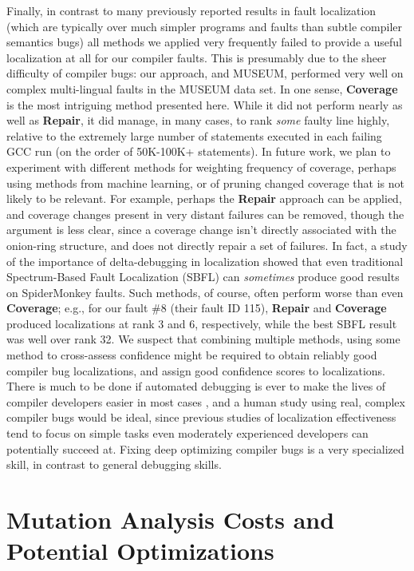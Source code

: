 Finally, in contrast to many previously reported results in fault localization (which are typically over much simpler programs and faults than subtle compiler semantics bugs) all methods we applied very frequently failed to provide a useful localization at all for our compiler faults.  This is presumably due to the sheer difficulty of compiler bugs:  our approach, and MUSEUM, performed very well on complex multi-lingual faults in the MUSEUM data set.  In one sense, {\bf Coverage} is the most intriguing method presented here.  While it did not perform nearly as well as {\bf Repair}, it did manage, in many cases, to rank \emph{some} faulty line highly, relative to the extremely large number of statements executed in each failing GCC run (on the order of 50K-100K+ statements).  In future work, we plan to experiment with different methods for weighting frequency of coverage, perhaps using methods from machine learning, or of pruning changed coverage that is not likely to be relevant.  For example, perhaps the {\bf Repair} approach can be applied, and coverage changes present in very distant failures can be removed, though the argument is less clear, since a coverage change isn't directly associated with the onion-ring structure, and does not directly repair a set of failures.  In fact, a study of the importance of delta-debugging in localization \cite{ReduceLocalize} showed that even traditional Spectrum-Based Fault Localization (SBFL) can \emph{sometimes} produce good results on SpiderMonkey faults.  Such methods, of course, often perform worse than even {\bf Coverage}; e.g., for our fault \#8 (their fault ID 115), {\bf Repair} and {\bf Coverage} produced localizations at rank 3 and 6, respectively, while the best SBFL result was well over rank 32.  We suspect that combining multiple methods, using some method to cross-assess confidence might be required to obtain reliably good compiler bug localizations, and assign good confidence scores to localizations.  There is much to be done if automated debugging is ever to make the lives of compiler developers easier in most cases \cite{AutoHelp}, and a human study using real, complex compiler bugs would be ideal, since previous studies of localization effectiveness tend to focus on simple tasks even moderately experienced developers can potentially succeed at.  Fixing deep optimizing compiler bugs is a very specialized skill, in contrast to general debugging skills.


\section{Mutation Analysis Costs and Potential Optimizations}
\label{sec:highcost}

